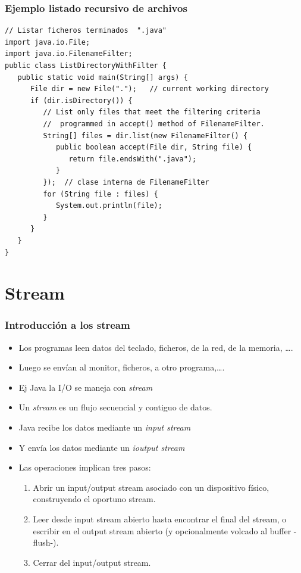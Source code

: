 \documentclass{beamer}
\begin{document}
\begin{frame}[fragile]
\frametitle{Ejemplo listado recursivo de archivos}
\begin{small}
\begin{verbatim}
// Listar ficheros terminados  ".java"
import java.io.File;
import java.io.FilenameFilter;
public class ListDirectoryWithFilter {
   public static void main(String[] args) {
      File dir = new File(".");   // current working directory
      if (dir.isDirectory()) {
         // List only files that meet the filtering criteria
         //  programmed in accept() method of FilenameFilter.
         String[] files = dir.list(new FilenameFilter() {
            public boolean accept(File dir, String file) {
               return file.endsWith(".java");
            }
         });  // clase interna de FilenameFilter
         for (String file : files) {
            System.out.println(file);
         }
      }
   }
}
\end{verbatim}
\end{small}
\end{frame}

\section{Stream}
\begin{frame}[fragile]
\frametitle{Introducción a los stream}
\begin{itemize}[<+->]
\item Los programas leen datos del teclado, ficheros, de la red, de la memoria, \dots.
\item Luego se envían al monitor, ficheros, a otro programa,\dots.
\item Ej Java la I/O se maneja con \emph{stream}
\item Un \emph{stream} es un flujo secuencial y contiguo de datos.
\item Java recibe los datos mediante un \emph{input stream}
\item Y envía los datos mediante un \emph{ioutput stream}
\item Las operaciones implican tres pasos:
\begin{enumerate}
\item Abrir un input/output stream asociado con un dispositivo físico, construyendo el oportuno stream.
\item Leer desde input stream abierto hasta encontrar el final del stream, o escribir en el output stream abierto (y opcionalmente volcado al buffer -flush-).
\item Cerrar del input/output stream.
\end{enumerate}
\end{itemize}
\end{frame}
\end{document}
